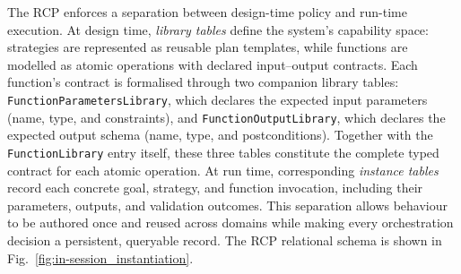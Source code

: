 \documentclass[largeformat]{interact}
\begin{document}
The RCP enforces a separation between design-time policy and run-time execution. At design time, \emph{library tables} define the system's capability space: strategies are represented as reusable plan templates, while functions are modelled as atomic operations with declared input--output contracts. Each function's contract is formalised through two companion library tables: \texttt{FunctionParametersLibrary}, which declares the expected input parameters (name, type, and constraints), and \texttt{FunctionOutputLibrary}, which declares the expected output schema (name, type, and postconditions). Together with the \texttt{FunctionLibrary} entry itself, these three tables constitute the complete typed contract for each atomic operation. At run time, corresponding \emph{instance tables} record each concrete goal, strategy, and function invocation, including their parameters, outputs, and validation outcomes. This separation allows behaviour to be authored once and reused across domains while making every orchestration decision a persistent, queryable record.
The RCP relational schema is shown in Fig.~\ref{fig:in-session_instantiation}.
\end{document}
